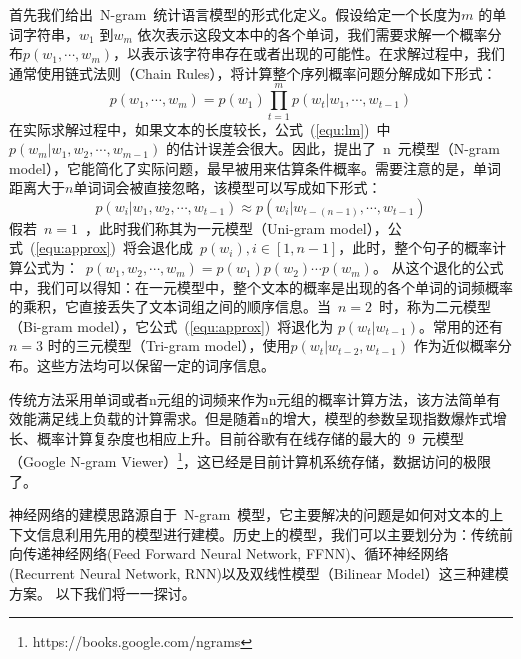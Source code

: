 首先我们给出~N-gram~统计语言模型的形式化定义。假设给定一个长度为$m$ 的单词字符串，$w_1$ 到$w_m$ 依次表示这段文本中的各个单词，我们需要求解一个概率分布$p(w_1,\cdots,w_m)$，以表示该字符串存在或者出现的可能性。在求解过程中，我们通常使用链式法则（Chain Rules），将计算整个序列概率问题分解成如下形式：
\begin{equation}
\label{equ:lm}
p(w_1,\cdots,w_m) =p(w_1)\prod_{t=1}^{m}p(w_t|w_1,\cdots,w_{t-1})
\end{equation}
在实际求解过程中，如果文本的长度较长，公式~(\ref{equ:lm})~中$ p(w_m | w_1,w_2,\cdots,w_{m-1}) $ 的估计误差会很大。因此，提出了~n~元模型（N-gram model），它能简化了实际问题，最早被用来估算条件概率。需要注意的是，单词距离大于$n$单词词会被直接忽略，该模型可以写成如下形式：
\begin{equation}
\label{equ:approx}
p(w_i | w_1,w_2,\cdots,w_{t-1})  \approx p(w_i | w_{t-(n-1)},\cdots,w_{t-1})
\end{equation}
假若~$n=1$~，此时我们称其为一元模型（Uni-gram model），公式~(\ref{equ:approx})~将会退化成~$p(w_i),i\in [1,n-1]$，此时，整个句子的概率计算公式为：~$p(w_1,w_2,\cdots,w_m) = p(w_1)p(w_2) \cdots p(w_m)$。
从这个退化的公式中，我们可以得知：在一元模型中，整个文本的概率是出现的各个单词的词频概率的乘积，它直接丢失了文本词组之间的顺序信息。当~$n = 2$~时，称为二元模型（Bi-gram model），它公式~(\ref{equ:approx})~将退化为 $p(w_t|w_{t-1})$。常用的还有 $n = 3$ 时的三元模型（Tri-gram model），使用$p(w_t |w_{t-2},w_{t-1})$ 作为近似概率分布。这些方法均可以保留一定的词序信息。

传统方法采用单词或者n元组的词频来作为n元组的概率计算方法，该方法简单有效能满足线上负载的计算需求。但是随着n的增大，模型的参数呈现指数爆炸式增长、概率计算复杂度也相应上升。目前谷歌有在线存储的最大的~9~元模型（Google N-gram Viewer）\footnote{https://books.google.com/ngrams}，这已经是目前计算机系统存储，数据访问的极限了。


神经网络的建模思路源自于~N-gram~模型，它主要解决的问题是如何对文本的上下文信息利用先用的模型进行建模。历史上的模型，我们可以主要划分为：传统前向传递神经网络(Feed Forward Neural Network, FFNN)、循环神经网络(Recurrent Neural Network, RNN)以及双线性模型（Bilinear Model）这三种建模方案。 以下我们将一一探讨。


